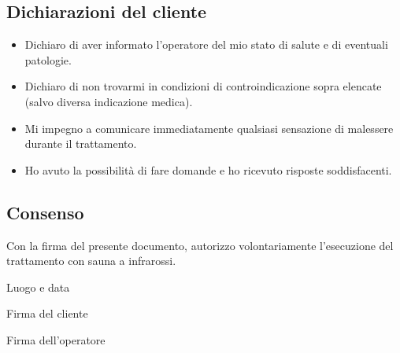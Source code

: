 \subsection*{Dichiarazioni del cliente}
\begin{itemize}
\item Dichiaro di aver informato l'operatore del mio stato di salute e di eventuali patologie.
\item Dichiaro di non trovarmi in condizioni di controindicazione sopra elencate (salvo diversa indicazione medica).
\item Mi impegno a comunicare immediatamente qualsiasi sensazione di malessere durante il trattamento.
\item Ho avuto la possibilità di fare domande e ho ricevuto risposte soddisfacenti.
\end{itemize}

\subsection*{Consenso}
Con la firma del presente documento, autorizzo volontariamente l'esecuzione del trattamento con sauna a infrarossi.

\vspace{2em}

Luogo e data \underline{\hspace{6cm}}

\vspace{2em}

Firma del cliente \underline{\hspace{6cm}}

\vspace{2em}

Firma dell'operatore \underline{\hspace{6cm}}